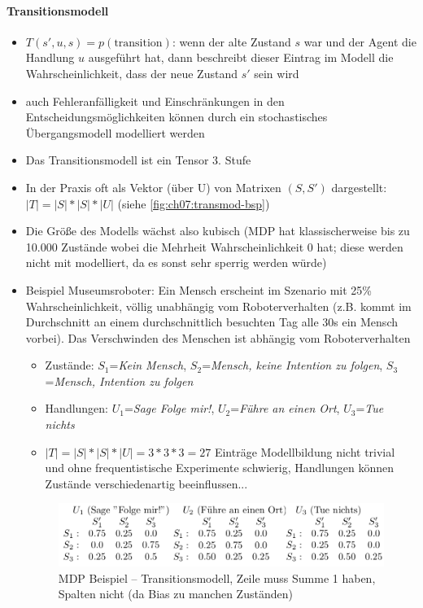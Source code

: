 \paragraph{Transitionsmodell}
\begin{itemize}
	\item $T(s', u, s) = p(\text{transition})$: wenn der alte Zustand $s$ war und der Agent die Handlung $u$ ausgef\"uhrt hat, dann beschreibt dieser Eintrag im Modell die Wahrscheinlichkeit, dass 			der neue Zustand $s'$ sein wird
	\item auch Fehleranfälligkeit und Einschränkungen in den Entscheidungsmöglichkeiten können durch ein stochastisches Übergangsmodell modelliert werden
	\item Das Transitionsmodell ist ein Tensor 3. Stufe
	\item In der Praxis oft als Vektor (\"uber U) von Matrixen $(S, S')$ dargestellt: $|T| = |S| * |S| * |U|$ (siehe \autoref{fig:ch07:transmod-bsp})
	\item Die Gr\"o{\ss}e des Modells w\"achst also kubisch (MDP hat klassischerweise bis zu 10.000 Zustände wobei die Mehrheit Wahrscheinlichkeit 0 hat; diese werden nicht mit modelliert, da es 				sonst sehr sperrig werden würde)
	\item Beispiel Museumsroboter: Ein Mensch erscheint im Szenario mit 25\% Wahrscheinlichkeit, völlig unabhängig vom Roboterverhalten (z.B. kommt im Durchschnitt an einem durchschnittlich besuchten  		Tag alle 30s ein Mensch vorbei). Das Verschwinden des Menschen ist abhängig vom Roboterverhalten
	\begin{itemize}
		\item Zustände: $S_1$=\textit{Kein Mensch}, $S_2$=\textit{Mensch, keine Intention zu folgen}, $S_3$=\textit{Mensch, Intention zu folgen} 
		\item Handlungen: $U_1$=\textit{Sage \glqq Folge mir!\grqq}, $U_2$=\textit{Führe an einen Ort}, $U_3$=\textit{Tue nichts}
		\item $|T| = |S| * |S| * |U| = 3*3*3=27$ Einträge
		\ita Modellbildung nicht trivial und ohne frequentistische Experimente schwierig, Handlungen können Zustände verschiedenartig beeinflussen...
	\end{itemize}
	\begin{figure}[!h]
		\centering
  		\includegraphics[width=0.6\linewidth]{figures/ch07_transmod-bsp.png}
		\caption{MDP Beispiel -- Transitionsmodell, Zeile muss Summe 1 haben, Spalten nicht (da Bias zu manchen Zuständen)}
		\label{fig:ch07:transmod-bsp}
	\end{figure}
\end{itemize}

